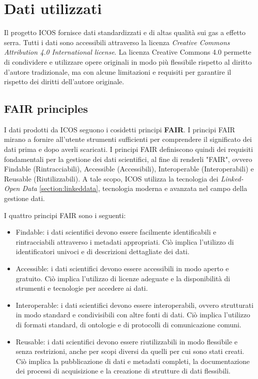\chapter{Dati utilizzati}
\label{chap:dati}

Il progetto ICOS fornisce dati standardizzati e di altas qualità sui gas a effetto serra.
Tutti i dati sono accessibili attraverso la licenza \textit{Creative Commons Attribution 4.0 International license}.
La licenza Creative Commons 4.0 permette di condividere e utilizzare opere originali in modo più flessibile rispetto
al diritto d'autore tradizionale, ma con alcune limitazioni e requisiti per garantire il rispetto dei diritti dell'autore originale.

\section{FAIR principles}
I dati prodotti da ICOS seguono i cosidetti principi \textbf{FAIR}.
I principi FAIR mirano a fornire all'utente strumenti sufficienti per 
comprendere il significato dei dati prima e dopo averli scaricati. 
I principi FAIR definiscono quindi dei requisiti fondamentali per
la gestione dei dati scientifici, al fine di renderli "FAIR",
ovvero Findable (Rintracciabili), Accessible (Accessibili), Interoperable (Interoperabili) e 
Reusable (Riutilizzabili). A tale scopo, ICOS utilizza la tecnologia dei \textit{Linked-Open Data} \ref{section:linkeddata},
tecnologia moderna e avanzata nel campo della gestione dati. 

I quattro principi FAIR sono i seguenti:

\begin{itemize}
    \item Findable: i dati scientifici devono essere facilmente identificabili e rintracciabili attraverso i metadati appropriati. Ciò implica l'utilizzo di identificatori univoci e di descrizioni dettagliate dei dati.
    \item Accessible: i dati scientifici devono essere accessibili in modo aperto e gratuito. Ciò implica l'utilizzo di licenze adeguate e la disponibilità di strumenti e tecnologie per accedere ai dati.
    \item Interoperable: i dati scientifici devono essere interoperabili, ovvero strutturati in modo standard e condivisibili con altre fonti di dati. Ciò implica l'utilizzo di formati standard, di ontologie e di protocolli di comunicazione comuni.
    \item Reusable: i dati scientifici devono essere riutilizzabili in modo flessibile e senza restrizioni, anche per scopi diversi da quelli per cui sono stati creati. Ciò implica la pubblicazione di dati e metadati completi, la documentazione dei processi di acquisizione e la creazione di strutture di dati flessibili.
\end{itemize}